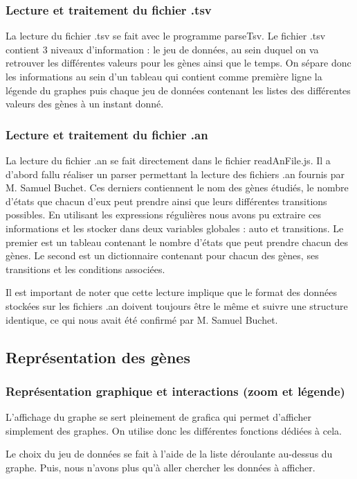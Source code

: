 \subsubsection{Lecture et traitement du fichier .tsv}
\bigbreak
La lecture du fichier .tsv se fait avec le programme parseTsv. Le fichier .tsv contient 3 niveaux d’information : le jeu de données, au sein duquel on va retrouver les différentes valeurs pour les gènes ainsi que le temps. On sépare donc les informations au sein d’un tableau qui contient comme première ligne la légende du graphes puis chaque jeu de données contenant les listes des différentes valeurs des gènes à un instant donné.
\bigbreak

\subsubsection{Lecture et traitement du fichier .an}
\bigbreak
La lecture du fichier .an se fait directement dans le fichier readAnFile.js. Il a d'abord fallu réaliser un parser permettant la lecture des fichiers .an fournis par M. Samuel Buchet. Ces derniers contiennent le nom des gènes étudiés, le nombre d'états que chacun d'eux peut prendre ainsi que leurs différentes transitions possibles. En utilisant les expressions régulières nous avons pu extraire ces informations et les stocker dans deux variables globales : auto et transitions. Le premier est un tableau contenant le nombre d’états que peut prendre chacun des gènes. Le second est un dictionnaire contenant pour chacun des gènes, ses transitions et les conditions associées.

Il est important de noter que cette lecture implique que le format des données stockées sur les fichiers .an doivent toujours être le même et suivre une structure identique, ce qui nous avait été confirmé par M. Samuel Buchet. 
\bigbreak

\newpage
\subsection{Représentation des gènes}
\bigbreak
\subsubsection{Représentation graphique et interactions (zoom et légende)}
\bigbreak
L’affichage du graphe se sert pleinement de grafica qui permet d’afficher simplement des graphes. On utilise donc les différentes fonctions dédiées à cela.

Le choix du jeu de données se fait à l’aide de la liste déroulante au-dessus du graphe. Puis, nous n’avons plus qu'à aller chercher les données à afficher.

